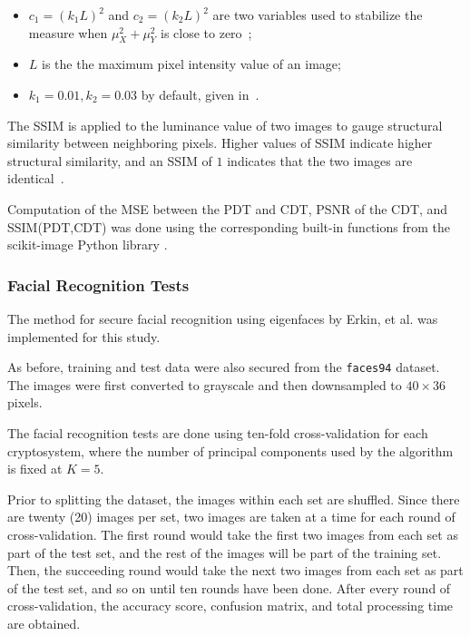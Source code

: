 \begin{description}
\begin{itemize}
		\item $c_1 = (k_1L)^2$ and $c_2 = (k_2L)^2$ are two variables used to stabilize the measure when $\mu_X^2+\mu_Y^2$ is close to zero~\cite{akramullah_video_2014};
		\item $L$ is the the maximum pixel intensity value of an image;
		\item $k_1 = 0.01, k_2 = 0.03$ by default, given in~\cite{ahmed_benchmark_2016}.
	\end{itemize}
	The SSIM is applied to the luminance value of two images to gauge structural similarity between neighboring pixels. Higher values of SSIM indicate higher structural similarity, and an SSIM of $1$ indicates that the two images are identical~\cite{ahmed_benchmark_2016}.
\end{description}

Computation of the MSE between the PDT and CDT, PSNR of the CDT, and SSIM(PDT,CDT) was done using the corresponding built-in functions from the scikit-image Python library \cite{scikit-image}.

\subsubsection{Facial Recognition Tests}
The method for secure facial recognition using eigenfaces by Erkin, et al. \cite{hutchison_privacy-preserving_2009} was implemented for this study.

As before, training and test data were also secured from the \texttt{faces94} dataset. The images were first converted to grayscale and then downsampled to $40 \times 36$ pixels.

The facial recognition tests are done using ten-fold cross-validation for each cryptosystem, where the number of principal components used by the algorithm is fixed at $K=5$.

Prior to splitting the dataset, the images within each set are shuffled. Since there are twenty (20) images per set, two images are taken at a time for each round of cross-validation. The first round would take the first two images from each set as part of the test set, and the rest of the images will be part of the training set. Then, the succeeding round would take the next two images from each set as part of the test set, and so on until ten rounds have been done. After every round of cross-validation, the accuracy score, confusion matrix, and total processing time are obtained.


